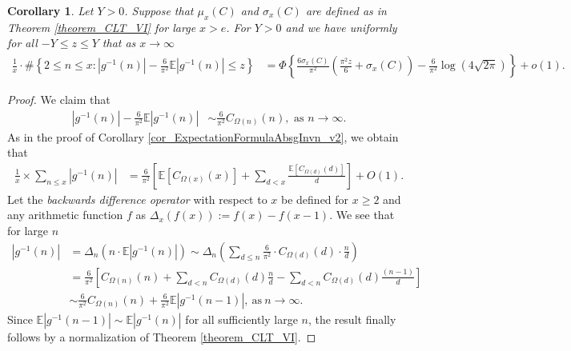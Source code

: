 \documentclass[11pt,reqno,a4letter]{article}
\numberwithin{figure}{section}
\numberwithin{table}{section}
\theoremstyle{plain}
\newtheorem{cor}[theorem]{Corollary}
\numberwithin{theorem}{section}
\theoremstyle{definition}
\begin{document}
\begin{cor} 
\label{cor_CLT_VII} 
Let $Y > 0$. Suppose that $\mu_x(C)$ and $\sigma_x(C)$ are defined as in 
Theorem \ref{theorem_CLT_VI} for large $x > e$. 
For $Y > 0$ and we have uniformly for all $-Y \leq z \leq Y$ 
that as $x \rightarrow \infty$ 
\begin{align*} 
\frac{1}{x} \cdot \#\left\{2 \leq n \leq x:|g^{-1}(n)| - 
     \frac{6}{\pi^2} \mathbb{E}|g^{-1}(n)| \leq z\right\} & = 
     \Phi\left\{\frac{6 \sigma_x(C)}{\pi^2}\left(\frac{\pi^2 z}{6} + \sigma_x(C)\right) - 
     \frac{6}{\pi^2} \log\left(4\sqrt{2\pi}\right)\right\} + o(1). 
\end{align*} 
\end{cor} 
\begin{proof} 
We claim that 
\begin{align*} 
|g^{-1}(n)| - \frac{6}{\pi^2} \mathbb{E}|g^{-1}(n)| & \sim \frac{6}{\pi^2} C_{\Omega(n)}(n), 
     \text{\ as\ } n \rightarrow \infty. 
\end{align*} 
As in the proof of Corollary \ref{cor_ExpectationFormulaAbsgInvn_v2}, 
we obtain that 
\begin{align*} 
\frac{1}{x} \times \sum_{n \leq x} |g^{-1}(n)| & = 
     \frac{6}{\pi^2} \left[\mathbb{E}[C_{\Omega(x)}(x)] + \sum_{d<x} 
     \frac{\mathbb{E}[C_{\Omega(d)}(d)]}{d}\right] + O(1). 
\end{align*} 
Let the \emph{backwards difference operator} with respect to $x$ 
be defined for $x \geq 2$ and any arithmetic function $f$ as 
$\Delta_x(f(x)) := f(x) - f(x-1)$. 
We see that for large $n$ 
\begin{align*} 
|g^{-1}(n)| & = \Delta_n(n \cdot \mathbb{E}|g^{-1}(n)|) 
     \sim \Delta_n\left(\sum_{d \leq n} \frac{6}{\pi^2} \cdot C_{\Omega(d)}(d) \cdot \frac{n}{d}\right) \\ 
     & = \frac{6}{\pi^2}\left[C_{\Omega(n)}(n) + \sum_{d < n} C_{\Omega(d)}(d) \frac{n}{d} - 
     \sum_{d<n} C_{\Omega(d)}(d) \frac{(n-1)}{d}\right] \\ 
     & \sim \frac{6}{\pi^2} C_{\Omega(n)}(n) + \frac{6}{\pi^2} \mathbb{E}|g^{-1}(n-1)|, 
     \mathrm{\ as\ } n \rightarrow \infty. 
\end{align*} 
Since $\mathbb{E}|g^{-1}(n-1)| \sim \mathbb{E}|g^{-1}(n)|$ for all sufficiently large $n$, 
the result finally follows by a normalization of Theorem \ref{theorem_CLT_VI}. 
\end{proof} 
\end{document}
